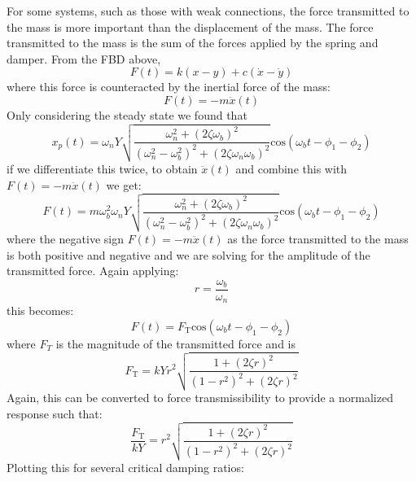 \documentclass[12pt,letter]{article}
\begin{document}
		For some systems, such as those with weak connections, the force transmitted to the mass is more important than the displacement of the mass. The force transmitted to the mass is the sum of the forces applied by the spring and damper. From the FBD above,
		\begin{equation}
		F(t) = k(x-y) + c(\dot{x} - \dot{y}) 
		\end{equation}
		where this force is counteracted by the inertial force of the mass:
		\begin{equation}
		F(t) = -m\ddot{x}(t)
		\end{equation}
		Only considering the steady state we found that 
		\begin{equation}
			x_p(t) = 	\omega_n Y   \sqrt{\frac{\omega_n^2 + (2 \zeta \omega_b)^2 }{(\omega_n^2 - \omega_b^2)^2 +  (2\zeta \omega_n \omega_b)^2} }  \text{cos}(\omega_bt - \phi_1 - \phi_2)
		\end{equation} 
		if we differentiate this twice, to obtain $\ddot{x}(t)$ and combine this with $F(t) = -m\ddot{x}(t)$ we get:
		\begin{equation}
			F(t) = 	m \omega_b^2 \omega_n Y   \sqrt{\frac{\omega_n^2 + (2 \zeta \omega_b)^2 }{(\omega_n^2 - \omega_b^2)^2 +  (2\zeta \omega_n \omega_b)^2} }  \text{cos}(\omega_bt - \phi_1 - \phi_2)
		\end{equation} 
		where the negative sign $F(t) = -m\ddot{x}(t)$ as the force transmitted to the mass is both positive and negative and we are solving for the amplitude of the transmitted force. Again applying:
		\begin{equation}
			r=\frac{\omega_b}{\omega_n}
		\end{equation} 
		this becomes:
		\begin{equation}
			F(t) = 	F_\text{T} \text{cos}(\omega_bt - \phi_1 - \phi_2)
		\end{equation} 
		where $F_T$ is the magnitude of the transmitted force and is 
		\begin{equation}
			F_\text{T} = kYr^2 \sqrt{\frac{1+(2 \zeta r)^2}{(1-r^2)^2 + (2 \zeta r )^2}} 
		\end{equation}
		Again, this can be converted to force transmissibility to provide a normalized response such that:
		\begin{equation}
			\frac{F_\text{T}}{kY} = r^2 \sqrt{\frac{1+(2 \zeta r)^2}{(1-r^2)^2 + (2 \zeta r )^2}} 
		\end{equation}
		Plotting this for several critical damping ratios:
\end{document}
